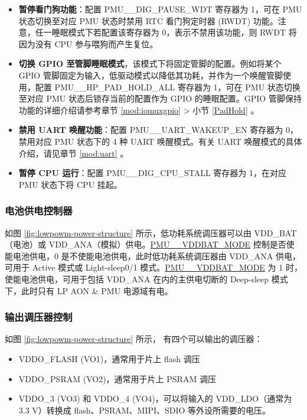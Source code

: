 \documentclass[main\_\_CN.tex]{subfiles}
\begin{document}
\begin{itemize}
\item \textbf{暂停看门狗功能}：配置 PMU\_\_DIG\_PAUSE\_WDT 寄存器为 1，可在 PMU 状态切换至对应 PMU 状态时禁用 RTC 看门狗定时器 (RWDT) 功能。注意，任一睡眠模式下若配置该寄存器为 0，表示不禁用该功能，则 RWDT 将因为没有 CPU 参与喂狗而产生复位。

\item \textbf{切换 GPIO 至管脚睡眠模式}，该模式下将固定管脚的配置。例如将某个 GPIO 管脚固定为输入，低驱动模式以降低其功耗，并作为一个唤醒管脚使用，配置 PMU\_\_HP\_PAD\_HOLD\_ALL 寄存器为 1，可在 PMU 状态切换至对应 PMU 状态后锁存当前的配置作为 GPIO 的睡眠配置。GPIO 管脚保持功能的详细介绍请参考章节 \ref{mod:iomuxgpio} \textit{} > 小节 \ref{PadHold} \textit{}。

\item \textbf{禁用 UART 唤醒功能}：配置 PMU\_\_UART\_WAKEUP\_EN 寄存器为 0，禁用对应 PMU 状态下的 4 种 UART 唤醒模式。有关 UART 唤醒模式的具体介绍，请见章节 \ref{mod:uart} \textit{}。

\item \textbf{暂停 CPU 运行}：配置 PMU\_\_DIG\_CPU\_STALL 寄存器为 1，在对应 PMU 状态下将 CPU 挂起。
\end{itemize}

\subsubsection{电池供电控制器}

如图 \ref{fig:lowpowm-power-structure} 所示，低功耗系统调压器可以由 VDD\_BAT（电池）或 VDD\_ANA（模拟）供电。\hyperref[fielddesc:PMUHPSLEEPVDDBATMODE]{PMU\_\_VDDBAT\_MODE} 控制是否使能电池供电，0 是不使能电池供电，此时低功耗系统调压器由 VDD\_ANA 供电，可用于 Active 模式或 Light-sleep0/1 模式。\hyperref[fielddesc:PMUHPSLEEPVDDBATMODE]{PMU\_\_VDDBAT\_MODE} 为 1 时，使能电池供电，可用于包括 VDD\_ANA 在内的主供电切断的 Deep-sleep 模式下，此时只有 LP AON \& PMU 电源域有电。

\subsubsection{输出调压器控制}

如图 \ref{fig:lowpowm-power-structure} 所示，\chipname{} 有四个可以输出的调压器：

\begin{itemize}
\item VDDO\_FLASH (VO1)，通常用于片上 flash 调压
\item VDDO\_PSRAM (VO2)，通常用于片上 PSRAM 调压
\item VDDO\_3 (VO3) 和 VDDO\_4 (VO4)，可以将输入的 VDD\_LDO（通常为 3.3 V）转换成 flash、PSRAM、MIPI、SDIO 等外设所需要的电压。
\end{itemize}
\end{document}

